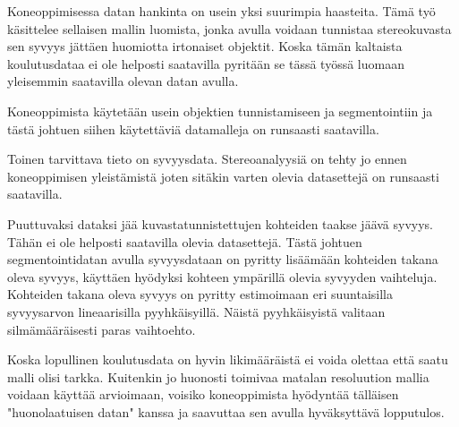 
Koneoppimisessa datan hankinta on usein yksi suurimpia haasteita. 
Tämä työ käsittelee sellaisen mallin luomista, jonka avulla voidaan tunnistaa stereokuvasta sen syvyys jättäen huomiotta irtonaiset objektit.
Koska tämän kaltaista koulutusdataa ei ole helposti saatavilla pyritään se tässä työssä luomaan yleisemmin saatavilla olevan datan avulla. 

Koneoppimista käytetään usein objektien tunnistamiseen ja segmentointiin ja tästä johtuen siihen käytettäviä datamalleja on runsaasti saatavilla.

Toinen tarvittava tieto on syvyysdata. 
Stereoanalyysiä on tehty jo ennen koneoppimisen yleistämistä joten sitäkin varten olevia datasettejä on runsaasti saatavilla. 

Puuttuvaksi dataksi jää kuvastatunnistettujen kohteiden taakse jäävä syvyys. Tähän ei ole helposti saatavilla olevia datasettejä.
Tästä johtuen segmentointidatan avulla syvyysdataan on pyritty lisäämään kohteiden takana oleva syvyys, käyttäen hyödyksi kohteen ympärillä olevia syvyyden vaihteluja.
Kohteiden takana oleva syvyys on pyritty estimoimaan eri suuntaisilla syvyysarvon lineaarisilla pyyhkäisyillä.
Näistä pyyhkäisyistä valitaan silmämääräisesti paras vaihtoehto.

Koska lopullinen koulutusdata on hyvin likimääräistä ei voida olettaa että saatu malli olisi tarkka.
Kuitenkin jo huonosti toimivaa matalan resoluution mallia voidaan käyttää arvioimaan,
voisiko koneoppimista hyödyntää tälläisen "huonolaatuisen datan" kanssa ja saavuttaa sen avulla hyväksyttävä lopputulos.